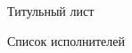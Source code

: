 \begin{titlepage}
  \begin{center}

    Титульный лист 
    
    Список исполнителей 
   
  \end{center}
\end{titlepage}

